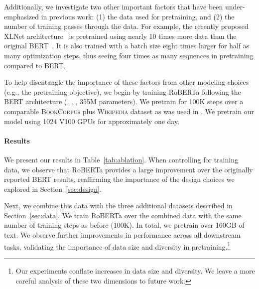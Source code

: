 \documentclass[11pt]{article}
\newcommand{\ourmodel}{RoBERTa}
\newcommand{\bertlarge}{BERT}
\begin{document}
Additionally, we investigate two other important factors that have been under-emphasized in previous work: (1) the data used for pretraining, and (2) the number of training passes through the data.
For example, the recently proposed XLNet architecture~\cite{yang2019xlnet} is pretrained using nearly 10 times more data than the original BERT~\cite{devlin2018bert}.
It is also trained with a batch size eight times larger for half as many optimization steps, thus seeing four times as many sequences in pretraining compared to BERT.

To help disentangle the importance of these factors from other modeling choices (e.g., the pretraining objective), we begin by training \ourmodel{} following the \bertlarge{} architecture (, , , 355M parameters).
We pretrain for 100K steps over a comparable \textsc{BookCorpus} plus \textsc{Wikipedia} dataset as was used in .
We pretrain our model using 1024 V100 GPUs for approximately one day.

\paragraph{Results}

We present our results in Table~\ref{tab:ablation}.
When controlling for training data, we observe that \ourmodel{} provides a large improvement over the originally reported \bertlarge{} results, reaffirming the importance of the design choices we explored in Section~\ref{sec:design}.

Next, we combine this data with the three additional datasets described in Section~\ref{sec:data}.
We train \ourmodel{} over the combined data with the same number of training steps as before (100K).
In total, we pretrain over 160GB of text.
We observe further improvements in performance across all downstream tasks, validating the importance of data size and diversity in pretraining.\footnote{Our experiments conflate increases in data size and diversity. We leave a more careful analysis of these two dimensions to future work.}
\end{document}
